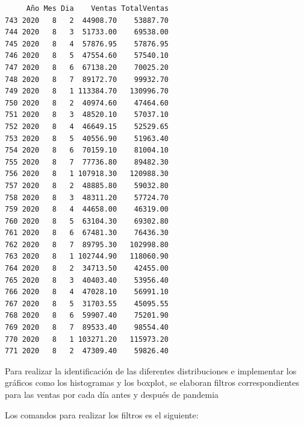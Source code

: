 \documentclass[
  us-letterpaper,
]{scrreprt}
\theoremstyle{plain}
\theoremstyle{plain}
\theoremstyle{definition}
\theoremstyle{remark}
\begin{document}
\begin{verbatim}
     Año Mes Dia    Ventas TotalVentas
743 2020   8   2  44908.70    53887.70
744 2020   8   3  51733.00    69538.00
745 2020   8   4  57876.95    57876.95
746 2020   8   5  47554.60    57540.10
747 2020   8   6  67138.20    70025.20
748 2020   8   7  89172.70    99932.70
749 2020   8   1 113384.70   130996.70
750 2020   8   2  40974.60    47464.60
751 2020   8   3  48520.10    57037.10
752 2020   8   4  46649.15    52529.65
753 2020   8   5  40556.90    51963.40
754 2020   8   6  70159.10    81004.10
755 2020   8   7  77736.80    89482.30
756 2020   8   1 107918.30   120988.30
757 2020   8   2  48885.80    59032.80
758 2020   8   3  48311.20    57724.70
759 2020   8   4  44658.00    46319.00
760 2020   8   5  63104.30    69302.80
761 2020   8   6  67481.30    76436.30
762 2020   8   7  89795.30   102998.80
763 2020   8   1 102744.90   118060.90
764 2020   8   2  34713.50    42455.00
765 2020   8   3  40403.40    53956.40
766 2020   8   4  47028.10    56991.10
767 2020   8   5  31703.55    45095.55
768 2020   8   6  59907.40    75201.90
769 2020   8   7  89533.40    98554.40
770 2020   8   1 103271.20   115973.20
771 2020   8   2  47309.40    59826.40
\end{verbatim}

Para realizar la identificación de las diferentes distribuciones e
implementar los gráficos como los histogramas y los boxplot, se elaboran
filtros correspondientes para las ventas por cada día antes y después de
pandemia

Los comandos para realizar los filtros es el siguiente:
\end{document}
